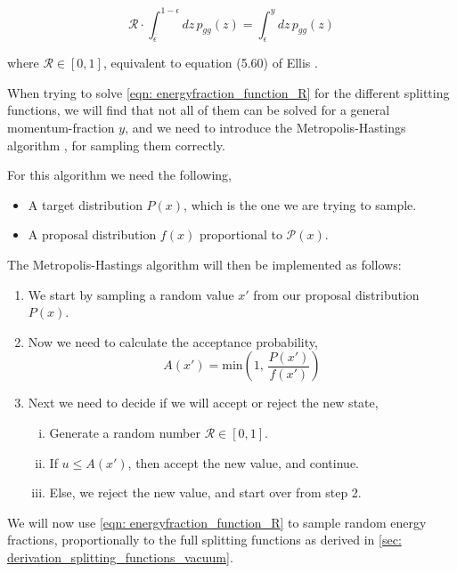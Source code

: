 \documentclass[main.tex]{subfiles}
\begin{document}
\begin{equation}\label{eqn: energyfraction_function_R}
    \mathcal{R} \cdot \int_\epsilon^{1-\epsilon} dz \, p_{gg}(z) = \int_\epsilon^{y}dz \, p_{gg}(z)
\end{equation}

where \(\mathcal{R}\in [0,1]\), equivalent to equation (5.60) of Ellis \cite{ellis_stirling_webber_1996}.


When trying to solve \autoref{eqn: energyfraction_function_R} for the different splitting functions, we will find that not all of them can be solved for a general momentum-fraction \(y\), and we need to introduce the Metropolis-Hastings algorithm \cite{enwiki:1048445594}, for sampling them correctly.

For this algorithm we need the following,
\begin{itemize}
    \item A target distribution \(P(x)\), which is the one we are trying to sample.
    \item A proposal distribution \(f(x)\) proportional to \(\mathcal{P}(x)\).
\end{itemize}

The Metropolis-Hastings algorithm will then be implemented as follows:

\begin{enumerate}
    \item We start by sampling a random value \(x'\) from our proposal distribution \(P(x)\).
    \item Now we need to calculate the acceptance probability,
    \[A(x') = \text{min} \left(1, \, \frac{P(x')}{f(x')}\right)\]
    \item Next we need to decide if we will accept or reject the new state,
    \begin{enumerate}[i)]
        \item Generate a random number \(\mathcal{R}\in [0,1]\).
        \item If \(u\leq A(x')\), then accept the new value, and continue.
        \item Else, we reject the new value, and start over from step 2.
    \end{enumerate}
\end{enumerate}


We will now use \autoref{eqn: energyfraction_function_R} to sample random energy fractions, proportionally to the full splitting functions as derived in \autoref{sec: derivation_splitting_functions_vacuum}.
\end{document}
